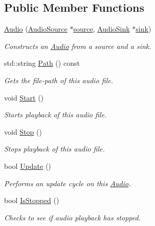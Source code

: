 \subsection*{Public Member Functions}
\begin{DoxyCompactItemize}
\item 
\hyperlink{classAudio_a05b36040e9d4ea4327de7c04f2e9d6ba}{Audio} (\hyperlink{classAudioSource}{Audio\+Source} $\ast$\hyperlink{classAudio_a0efa7be67424d967c551ecc82cda02eb}{source}, \hyperlink{classAudioSink}{Audio\+Sink} $\ast$\hyperlink{classAudio_ae7dddd283486a0d1555e9bc6a0d63cff}{sink})
\begin{DoxyCompactList}\small\item\em Constructs an \hyperlink{classAudio}{Audio} from a source and a sink. \end{DoxyCompactList}\item 
std\+::string \hyperlink{classAudio_a07d67a424301e3e859e78fe30fb05d68}{Path} () const 
\begin{DoxyCompactList}\small\item\em Gets the file-\/path of this audio file. \end{DoxyCompactList}\item 
void \hyperlink{classAudio_a545c9a12f31bc6964ac90bbf2358ada2}{Start} ()
\begin{DoxyCompactList}\small\item\em Starts playback of this audio file. \end{DoxyCompactList}\item 
void \hyperlink{classAudio_a1bd980bcdd3778875b019d7352e75754}{Stop} ()
\begin{DoxyCompactList}\small\item\em Stops playback of this audio file. \end{DoxyCompactList}\item 
bool \hyperlink{classAudio_a6db65dd8ffbd616d3f5dc81b5144c864}{Update} ()
\begin{DoxyCompactList}\small\item\em Performs an update cycle on this \hyperlink{classAudio}{Audio}. \end{DoxyCompactList}\item 
bool \hyperlink{classAudio_ac05b824652de67714008e891b77dc362}{Is\+Stopped} ()
\begin{DoxyCompactList}\small\item\em Checks to see if audio playback has stopped. \end{DoxyCompactList}\item 

\end{DoxyCompactItemize}

